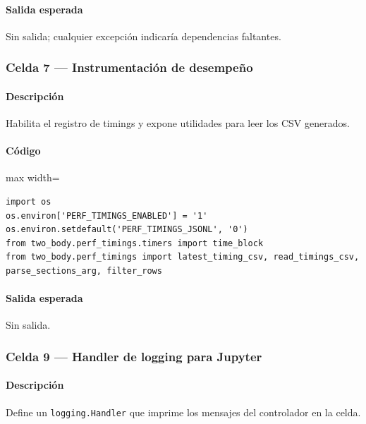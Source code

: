 \paragraph{Salida esperada} Sin salida; cualquier excepción indicaría dependencias faltantes.

\subsubsection*{Celda 7 — Instrumentación de desempeño}
\paragraph{Descripción} Habilita el registro de timings y expone utilidades para leer los CSV generados.
\paragraph{Código}
\begin{listing}[H]
\caption{Celda 7: configuración de \texttt{perf\_timings}}
\begin{adjustbox}{max width=\textwidth}
\begin{minipage}{\textwidth}
\begin{verbatim}
import os
os.environ['PERF_TIMINGS_ENABLED'] = '1'
os.environ.setdefault('PERF_TIMINGS_JSONL', '0')
from two_body.perf_timings.timers import time_block
from two_body.perf_timings import latest_timing_csv, read_timings_csv, parse_sections_arg, filter_rows
\end{verbatim}
\end{minipage}
\end{adjustbox}
\end{listing}
\paragraph{Salida esperada} Sin salida.

\subsubsection*{Celda 9 — Handler de logging para Jupyter}
\paragraph{Descripción} Define un \texttt{logging.Handler} que imprime los mensajes del controlador en la celda.

